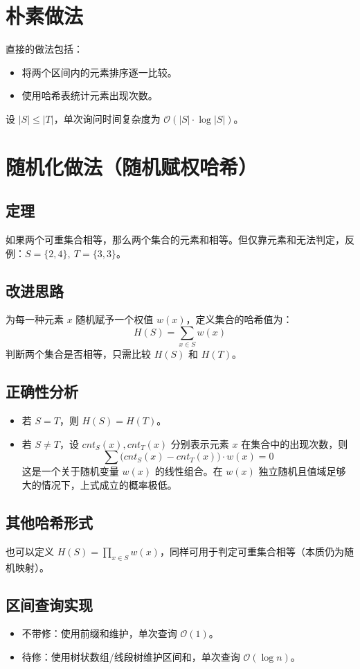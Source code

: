 \documentclass[11pt,a4paper,twocolumn]{ctexart}  %
\begin{document}
\section*{朴素做法}
直接的做法包括：
\begin{itemize}
    \item 将两个区间内的元素排序逐一比较。
    \item 使用哈希表统计元素出现次数。
\end{itemize}
设 $|S|\le|T|$，单次询问时间复杂度为 $\mathcal{O}(|S|\cdot\log|S|)$。

\section*{随机化做法（随机赋权哈希）}
\subsection*{定理}
如果两个可重集合相等，那么两个集合的元素和相等。但仅靠元素和无法判定，反例：$S=\{2,4\},\ T=\{3,3\}$。

\subsection*{改进思路}
为每一种元素 $x$ 随机赋予一个权值 $w(x)$，定义集合的哈希值为：
\[
H(S)=\sum_{x\in S} w(x)
\]
判断两个集合是否相等，只需比较 $H(S)$ 和 $H(T)$。

\subsection*{正确性分析}
\begin{itemize}
    \item 若 $S=T$，则 $H(S)=H(T)$。
    \item 若 $S\neq T$，设 $cnt_S(x),cnt_T(x)$ 分别表示元素 $x$ 在集合中的出现次数，则
    \[
    \sum\bigl(cnt_S(x)-cnt_T(x)\bigr)\cdot w(x)=0
    \]
    这是一个关于随机变量 $w(x)$ 的线性组合。在 $w(x)$ 独立随机且值域足够大的情况下，上式成立的概率极低。
\end{itemize}

\subsection*{其他哈希形式}
也可以定义 $H(S)=\prod_{x\in S} w(x)$，同样可用于判定可重集合相等（本质仍为随机映射）。

\subsection*{区间查询实现}
\begin{itemize}
    \item 不带修：使用前缀和维护，单次查询 $\mathcal{O}(1)$。
    \item 待修：使用树状数组/线段树维护区间和，单次查询 $\mathcal{O}(\log n)$。
\end{itemize}
\end{document}
